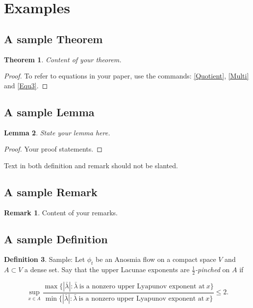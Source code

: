 \documentclass{aims}
\newtheorem{theorem}{Theorem}[section]
\newtheorem{lemma}[theorem]{Lemma}
\theoremstyle{definition}
\newtheorem{definition}[theorem]{Definition}
\newtheorem{remark}{Remark}
\begin{document}
\section{Examples}

\subsection{A sample Theorem}

\begin{theorem} \label{result1}
        Content of your theorem.
\end{theorem}

\begin{proof}
To refer to equations in your paper, use the commands:
\ref{Quotient}, \ref{Multi} and \ref{Equ3}.
\end{proof}

\subsection{A sample Lemma}

\begin{lemma} \label{L: Lyapunov exponents} State your lemma here.
\end{lemma}

\begin{proof}
Your proof statements.
\end{proof}

Text in both definition and remark should not be slanted.
\subsection{A sample Remark}

\begin{remark}
Content of your remarks.
\end{remark}
\subsection{A sample Definition}

\begin{definition} Sample: Let $\phi_{t}$ be an Anosmia flow on a
        compact space $V$ and $A \subset V$ a dense set. Say
        that the upper Lacunae exponents are
        \emph{$\frac{1}{2}$-pinched} on $A$ if
\bigskip

  \begin{equation}\label{Quotient}
        \sup_{x \in A} \frac{\max \{ |\bar{\lambda}|: \bar{\lambda} \
        \text{is a nonzero upper Lyapunov exponent at} \ x \}}
        {\min \{ |\bar{\lambda}|: \bar{\lambda} \ \text{is a
        nonzero upper Lyapunov exponent at} \ x\}}
         \leq 2.
  \end{equation}
\end{definition}
\bigskip
\end{document}
